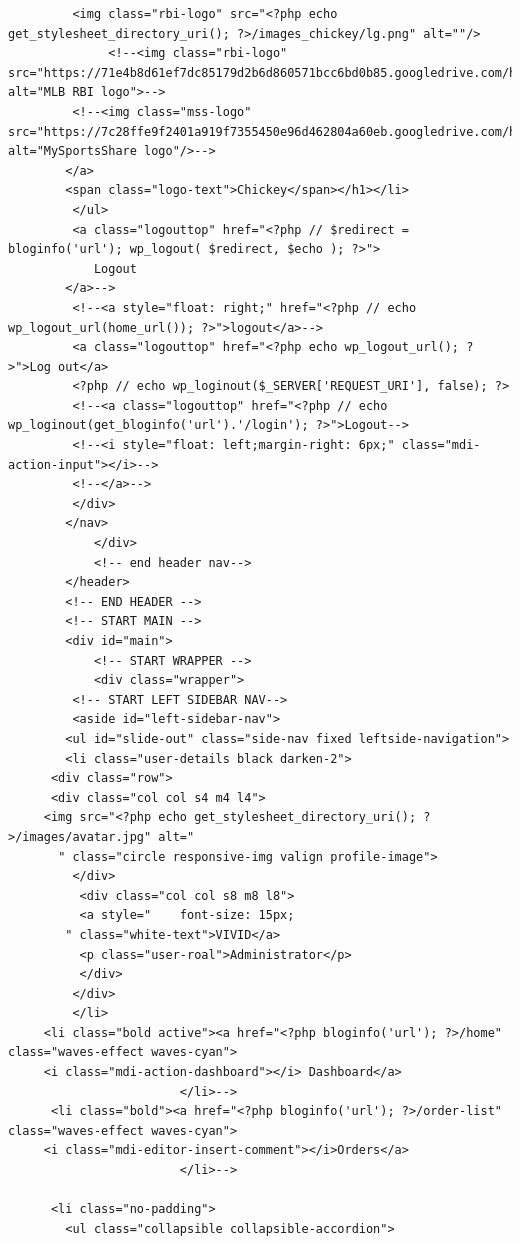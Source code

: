 \documentclass[a4paper,12pt]{article}
\begin{document}
\begin{verbatim}
         <img class="rbi-logo" src="<?php echo get_stylesheet_directory_uri(); ?>/images_chickey/lg.png" alt=""/>
              <!--<img class="rbi-logo"          src="https://71e4b8d61ef7dc85179d2b6d860571bcc6bd0b85.googledrive.com/host/0B9LVk4xbDIJTc2dQcXUwRXI2eTg" alt="MLB RBI logo">-->
         <!--<img class="mss-logo" src="https://7c28ffe9f2401a919f7355450e96d462804a60eb.googledrive.com/host/0B9LVk4xbDIJTXzBteFBFYS0ydWc" alt="MySportsShare logo"/>-->
        </a> 
        <span class="logo-text">Chickey</span></h1></li>
         </ul>                   
         <a class="logouttop" href="<?php // $redirect = bloginfo('url'); wp_logout( $redirect, $echo ); ?>">
            Logout
        </a>-->
         <!--<a style="float: right;" href="<?php // echo wp_logout_url(home_url()); ?>">logout</a>-->
         <a class="logouttop" href="<?php echo wp_logout_url(); ?>">Log out</a>
         <?php // echo wp_loginout($_SERVER['REQUEST_URI'], false); ?>
         <!--<a class="logouttop" href="<?php // echo wp_loginout(get_bloginfo('url').'/login'); ?>">Logout--> 
         <!--<i style="float: left;margin-right: 6px;" class="mdi-action-input"></i>-->
         <!--</a>-->
         </div>
        </nav>
            </div>
            <!-- end header nav-->
        </header>
        <!-- END HEADER -->
        <!-- START MAIN -->
        <div id="main">
            <!-- START WRAPPER -->
            <div class="wrapper">
         <!-- START LEFT SIDEBAR NAV-->
         <aside id="left-sidebar-nav">
        <ul id="slide-out" class="side-nav fixed leftside-navigation">
        <li class="user-details black darken-2">
      <div class="row">
      <div class="col col s4 m4 l4">
     <img src="<?php echo get_stylesheet_directory_uri(); ?>/images/avatar.jpg" alt="
       " class="circle responsive-img valign profile-image">
         </div>
          <div class="col col s8 m8 l8">
          <a style="    font-size: 15px;
        " class="white-text">VIVID</a>
          <p class="user-roal">Administrator</p>
          </div>
         </div>
         </li>
     <li class="bold active"><a href="<?php bloginfo('url'); ?>/home" class="waves-effect waves-cyan">
     <i class="mdi-action-dashboard"></i> Dashboard</a>
                        </li>-->
      <li class="bold"><a href="<?php bloginfo('url'); ?>/order-list" class="waves-effect waves-cyan">
     <i class="mdi-editor-insert-comment"></i>Orders</a>
                        </li>-->

      <li class="no-padding">
        <ul class="collapsible collapsible-accordion">         


\end{verbatim}
\end{document}
